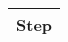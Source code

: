 \documentclass{article}
\begin{document}
\begin{tabular}{|c|}
\hline
Step\\
\hline\hline
\end{tabular}
\end{document}
